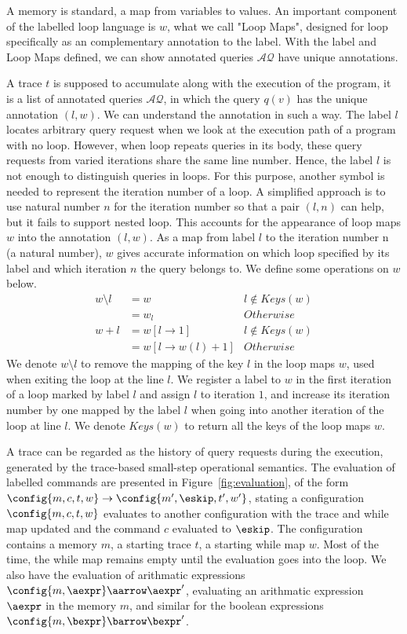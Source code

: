 A memory is standard, a map from variables to values. 
  An important component of the labelled loop language is $w$, what we call "Loop Maps", designed for loop specifically as an complementary annotation to the label. With the label and Loop Maps defined, we can show annotated queries $ \mathcal{AQ}$ have unique annotations.
  
 A trace $t$ is supposed to accumulate along with the execution of the program, it is
a list of annotated queries $ \mathcal{AQ}$, in which the query $q(v)$ has the unique annotation $(l,w)$. We can understand the annotation in such a way. The label $l$ locates arbitrary query request when we look at the execution path of a program with no loop. However, when loop repeats queries in its body, these query requests from varied iterations share the same line number. Hence, the label $l$ is not enough to distinguish queries in loops. For this purpose, another symbol is needed to represent the iteration number of a loop.
A simplified approach is to use natural number $n$ for the iteration number so that a pair $(l, n)$ can help, but it fails to support nested loop. This accounts for the appearance of loop maps $w$ into the annotation $(l,w)$. As a map from label $l$ to the iteration number n (a natural number), $w$ gives accurate information on which loop specified by its label and which iteration $n$ the query belongs to. We define some operations on $w$ below.
\[
\begin{array}{lll}
w \setminus l     & = w  & l \not\in Keys(w)   \\
     & = w_l & Otherwise \\
w + l & = w[l \to 1] & l \not \in Keys(w) \\   
     & = w [l \to w(l)+1] & Otherwise
\end{array}
\]
We denote $w \setminus l$ to remove the mapping of the key $l$ in the loop maps $w$, used when exiting the loop at the line $l$. We register a label to $w$ in the first iteration of a loop marked by label $l$ and assign $l$ to iteration $1$, and increase its iteration number by one mapped by the label $l$ when going into another iteration of the loop at line $l$. We denote $Keys(w)$ to return all the keys of the loop maps $w$.


A trace can be regarded as the history of query requests during the execution, generated by the trace-based small-step operational semantics. The evaluation of labelled commands are presented in Figure~\ref{fig:evaluation}, of the form $ \config{m,c, t, w} \to \config{m', \eskip, t', w'} $, stating a configuration $\config{m, c, t,w}$ evaluates to another configuration with the trace and while map updated and the command $c$ evaluated to $\eskip$. The configuration contains a memory $m$, a starting trace $t$, a starting while map $w$. Most of the time, the while map remains empty until the evaluation goes into the loop. We also have the evaluation of arithmatic expressions $\config{m,\aexpr} \aarrow \aexpr' $, evaluating an arithmatic expression $\aexpr$ in the memory $m$, and similar for the boolean expressions $\config{m, \bexpr} \barrow \bexpr'$.   

